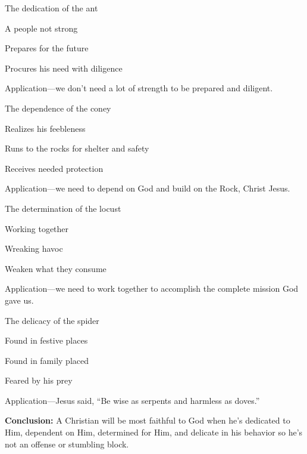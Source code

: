 \begin{compactenum}[I.]
    \item The dedication of the ant
    \begin{compactenum}[A.]
	    \item A people not strong
	    \item Prepares for the future
	    \item Procures his need with diligence
	    \item Application—we don’t need a lot of strength to be prepared and diligent.
	\end{compactenum}
    \item The dependence of the coney
    \begin{compactenum}[A.]
	    \item Realizes his feebleness
	    \item Runs to the rocks for shelter and safety
	    \item Receives needed protection
	    \item Application—we need to depend on God and build on the Rock, Christ Jesus.
		\end{compactenum}
    \item The determination of the locust
    \begin{compactenum}[A.]
	    \item Working together
	    \item Wreaking havoc
	    \item Weaken what they consume
	    \item Application—we need to work together to accomplish the complete mission God gave us.
		\end{compactenum}
    \item The delicacy of the spider
    \begin{compactenum}[A.]
	    \item Found in festive places
	    \item Found in family placed
	    \item Feared by his prey
	    \item Application—Jesus said, “Be wise as serpents and harmless as doves.”\\
	\end{compactenum}
\end{compactenum}

\noindent  \textbf{Conclusion: } A Christian will be most faithful to God when he’s dedicated to Him, dependent on Him, determined for Him, and delicate in his behavior so he’s not an offense or stumbling block.



